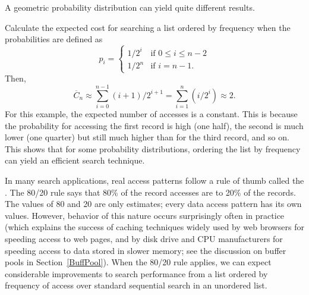 A geometric probability distribution
can yield quite different results.

\newpage

\begin{example}
Calculate the expected cost for searching a list ordered by frequency
when the probabilities are defined as
\[ p_i = \left\{ \begin{array}{ll}
1/2^i & \mbox{if \(0 \leq i \leq n-2\)}\\
1/2^n & \mbox{if \(i = n-1\).}
\end{array} \right. \]
\noindent Then,
\[ \overline{C}_n \approx \sum_{i=0}^{n-1} (i+1)/2^{i+1} =
\sum_{i=1}^n (i/2^i) \approx 2. \]
For this example, the expected number of accesses is a constant.
This is because the probability for accessing the first record is
high (one half), the second is much lower (one quarter) but still much
higher than for the third record, and so on.
This shows that for some probability distributions, ordering the list
by frequency can yield an efficient search technique.
\end{example}

\vspace{-\smallskipamount}
In many search applications, real access patterns follow a rule of
thumb called the .
The 80/20 rule says that 80\% of the record accesses are to 20\%
of the records.
The values of 80 and 20 are only estimates; every data access pattern
has its own values.
However, behavior of this nature occurs surprisingly often in practice
(which explains the success of caching techniques widely
used by web browsers for speeding access to web pages,
and by disk drive and CPU manufacturers for speeding access to data
stored in slower memory; see the discussion on buffer
pools in Section~\ref{BuffPool}).
When the 80/20 rule applies, we can expect considerable improvements
to search performance from a list ordered by frequency of access over
standard sequential search in an unordered list.

